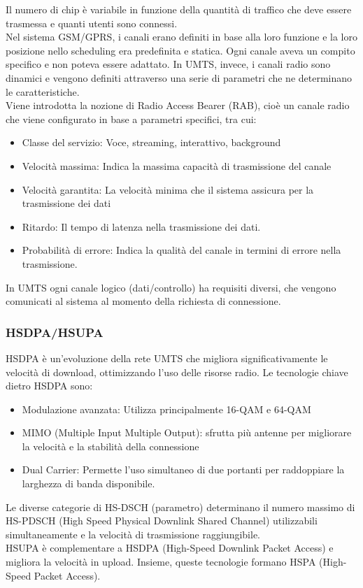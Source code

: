 Il numero di chip è variabile in funzione della quantità di traffico che deve essere trasmessa e quanti utenti sono connessi.\\

Nel sistema GSM/GPRS, i canali erano definiti in base alla loro funzione e la loro posizione nello scheduling era predefinita e statica. Ogni canale aveva un compito specifico e non poteva essere adattato.  In UMTS, invece, i canali radio sono dinamici e vengono definiti attraverso una serie di parametri che ne determinano le caratteristiche. \\

Viene introdotta la nozione di Radio Access Bearer (RAB), cioè un canale radio che viene configurato in base a parametri specifici, tra cui:
\begin{itemize}
	\item Classe del servizio: Voce, streaming, interattivo, background
	\item Velocità massima: Indica la massima capacità di trasmissione del canale
	\item Velocità garantita: La velocità minima che il sistema assicura per la trasmissione dei dati
	\item Ritardo: Il tempo di latenza nella trasmissione dei dati.
	\item Probabilità di errore: Indica la qualità del canale in termini di errore nella trasmissione.
\end{itemize}

In UMTS ogni canale logico (dati/controllo) ha requisiti diversi, che vengono comunicati al sistema al momento della richiesta di connessione. \\

\subsubsection{HSDPA/HSUPA}

HSDPA è un'evoluzione della rete UMTS che migliora significativamente le velocità di download, ottimizzando l’uso delle risorse radio. Le tecnologie chiave dietro HSDPA sono:
\begin{itemize}
	\item Modulazione avanzata: Utilizza principalmente 16-QAM e 64-QAM
	\item MIMO (Multiple Input Multiple Output): sfrutta più antenne per migliorare la velocità e la stabilità della connessione
	\item Dual Carrier: Permette l'uso simultaneo di due portanti per raddoppiare la larghezza di banda disponibile.
\end{itemize}

Le diverse categorie di HS-DSCH (parametro) determinano il numero massimo di HS-PDSCH (High Speed Physical Downlink Shared Channel) utilizzabili simultaneamente e la velocità di trasmissione raggiungibile.\\

HSUPA è complementare a HSDPA (High-Speed Downlink Packet Access) e migliora la velocità in upload. Insieme, queste tecnologie formano HSPA (High-Speed Packet Access).\\


\newpage